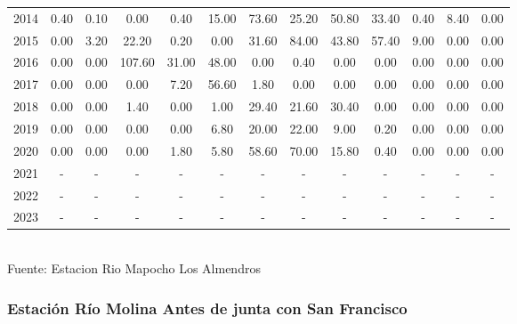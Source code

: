 \documentclass{article} %
\begin{document}
\begin{table}[H]
{\begin{tabular}{|c|c|c|c|c|c|c|c|c|c|c|c|c|}
        2014 & 0.40 & 0.10 & 0.00 & 0.40 & 15.00 & 73.60 & 25.20 & 50.80 & 33.40 & 0.40 & 8.40 & 0.00 \\
        2015 & 0.00 & 3.20 & 22.20 & 0.20 & 0.00 & 31.60 & 84.00 & 43.80 & 57.40 & 9.00 & 0.00 & 0.00 \\
        2016 & 0.00 & 0.00 & 107.60 & 31.00 & 48.00 & 0.00 & 0.40 & 0.00 & 0.00 & 0.00 & 0.00 & 0.00 \\
        2017 & 0.00 & 0.00 & 0.00 & 7.20 & 56.60 & 1.80 & 0.00 & 0.00 & 0.00 & 0.00 & 0.00 & 0.00 \\
        2018 & 0.00 & 0.00 & 1.40 & 0.00 & 1.00 & 29.40 & 21.60 & 30.40 & 0.00 & 0.00 & 0.00 & 0.00 \\
        2019 & 0.00 & 0.00 & 0.00 & 0.00 & 6.80 & 20.00 & 22.00 & 9.00 & 0.20 & 0.00 & 0.00 & 0.00 \\
        2020 & 0.00 & 0.00 & 0.00 & 1.80 & 5.80 & 58.60 & 70.00 & 15.80 & 0.40 & 0.00 & 0.00 & 0.00 \\
        2021 & - & - & - & - & - & - & - & - & - & - & - & - \\
        2022 & - & - & - & - & - & - & - & - & - & - & - & - \\
        2023 & - & - & - & - & - & - & - & - & - & - & - & - \\
        \hline
    \end{tabular}%
    }
    \label{tab:precipitaciones_rio_mapocho}
    \vspace{0.2cm}
    \\Fuente: Estacion Rio Mapocho Los Almendros
\end{table}


\subsubsection{Estación Río Molina Antes de junta con San Francisco}
\end{document}
